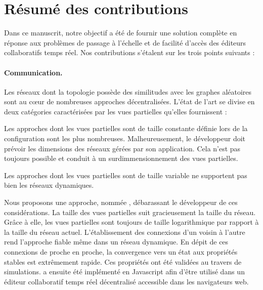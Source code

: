 
\section{Résumé des contributions}
\label{conclu:sec:summary}

Dans ce manuscrit, notre objectif a été de fournir une solution complète en
réponse aux problèmes de passage à l'échelle et de facilité d'accès des éditeurs
collaboratifs temps réel. Nos contributions s'étalent sur les trois points
suivants :

\paragraph{Communication.} Les réseaux dont la topologie possède des similitudes
avec les graphes aléatoires sont au cœur de nombreuses approches
décentralisées. L'état de l'art se divise en deux catégories caractérisées par
les vues partielles qu'elles fournissent :
\begin{inparaenum}[(i)]
\item Les approches dont les vues partielles sont de taille constante définie
  lors de la configuration sont les plus nombreuses. Malheureusement, le
  développeur doit prévoir les dimensions des réseaux gérées par son
  application. Cela n'est pas toujours possible et conduit à un
  surdimmensionnement des vues partielles.
\item Les approches dont les vues partielles sont de taille variable ne
  supportent pas bien les réseaux dynamiques.
\end{inparaenum}
Nous proposons une approche, nommée \SPRAY, débarassant le développeur de ces
considérations. La taille des vues partielles suit gracieusement la taille du
réseau. Grâce à elle, les vues partielles sont toujours de taille logarithmique
par rapport à la taille du réseau actuel. L'établissement des connexions d'un
voisin à l'autre rend l'approche fiable même dans un réseau dynamique. En dépit
de ces connexions de proche en proche, la convergence vers un état aux
propriétés stables est extrêmement rapide. Ces propriétés ont été validées au
travers de simulations. \SPRAY a ensuite été implémenté en Javascript afin
d'être utilisé dans un éditeur collaboratif temps réel décentralisé accessible
dans les navigateurs web.

